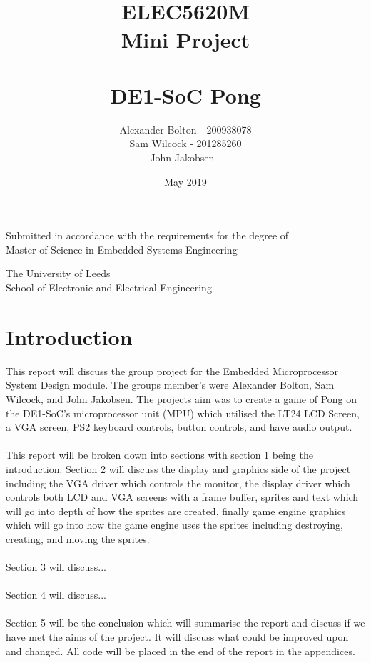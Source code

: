 \documentclass[a4paper,12pt]{article}
\begin{document}
\title{\\ \textbf{ELEC5620M \\ Mini Project \\ \- \\ DE1-SoC Pong }}
\author{Alexander Bolton - 200938078 \\ Sam Wilcock - 201285260\\ John Jakobsen - }
\date{May 2019}
\maketitle
\begin{center}
Submitted in accordance with the requirements for the degree of \\
Master of Science in Embedded Systems Engineering
\end{center}
\vfill
\begin{center}
The University of Leeds \\  School of Electronic and Electrical Engineering
\end{center}
\newpage

\tableofcontents
\newpage 
\section{Introduction}
\begin{flushleft}
This report will discuss the group project for the Embedded Microprocessor System Design module. The groups member's were Alexander Bolton, Sam Wilcock, and John Jakobsen. The projects aim was to create a game of Pong on the DE1-SoC's microprocessor unit (MPU) which utilised the LT24 LCD Screen, a VGA screen, PS2 keyboard controls, button controls, and have audio output.
\\ \- \\
This report will be broken down into sections with section 1 being the introduction. Section 2 will discuss the display and graphics side of the project including the VGA driver which controls the monitor, the display driver which controls both LCD and VGA screens with a frame buffer, sprites and text which will go into depth of how the sprites are created, finally game engine graphics which will go into how the game engine uses the sprites including destroying, creating, and moving the sprites. 
\\ \- \\
Section 3 will discuss...
\\ \- \\
Section 4 will discuss...
\\ \- \\
Section 5 will be the conclusion which will summarise the report and discuss if we have met the aims of the project. It will discuss what could be improved upon and changed. All code will be placed in the end of the report in the appendices. 
\end{flushleft}
\newpage
\end{document}
